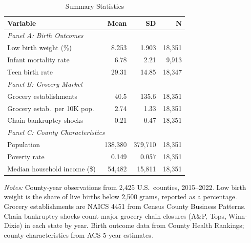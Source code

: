 \begin{table}[htbp]
\centering
\caption{Summary Statistics}
\label{tab:sumstats}
\begin{tabular}{lrrr}
\toprule
Variable & Mean & SD & N \\
\midrule
\multicolumn{4}{l}{\textit{Panel A: Birth Outcomes}} \\
Low birth weight (\%) & 8.253 & 1.903 & 18,351 \\
Infant mortality rate & 6.78 & 2.21 & 9,913 \\
Teen birth rate & 29.31 & 14.85 & 18,347 \\
\midrule
\multicolumn{4}{l}{\textit{Panel B: Grocery Market}} \\
Grocery establishments & 40.5 & 135.6 & 18,351 \\
Grocery estab.\ per 10K pop.\ & 2.74 & 1.33 & 18,351 \\
Chain bankruptcy shocks & 0.21 & 0.47 & 18,351 \\
\midrule
\multicolumn{4}{l}{\textit{Panel C: County Characteristics}} \\
Population & 138,380 & 379,710 & 18,351 \\
Poverty rate & 0.149 & 0.057 & 18,351 \\
Median household income (\$) & 54,482 & 15,811 & 18,351 \\
\bottomrule
\end{tabular}
\par\vspace{0.3em}
{\small \textit{Notes:} County-year observations from 2,425 U.S.\ counties, 2015--2022. Low birth weight is the share of live births below 2,500 grams, reported as a percentage. Grocery establishments are NAICS 4451 from Census County Business Patterns. Chain bankruptcy shocks count major grocery chain closures (A\&P, Tops, Winn-Dixie) in each state by year. Birth outcome data from County Health Rankings; county characteristics from ACS 5-year estimates.}
\end{table}
